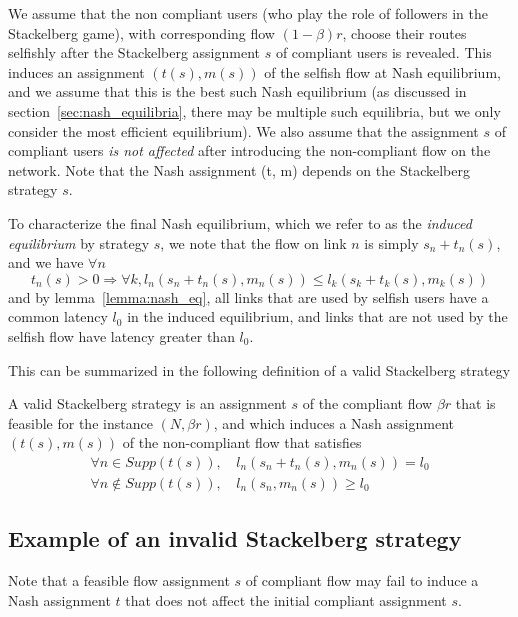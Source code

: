 We assume that the non compliant users (who play the role of followers in the Stackelberg game), with corresponding flow $(1-\beta)r$, choose their routes selfishly after the Stackelberg assignment $s$ of compliant users is revealed. This induces an assignment $(t(s), m(s))$ of the selfish flow at Nash equilibrium, and we assume that this is the best such Nash equilibrium (as discussed in section~\ref{sec:nash_equilibria}, there may be multiple such equilibria, but we only consider the most efficient equilibrium). We also assume that the assignment $s$ of compliant users \emph{is not affected} after introducing the non-compliant flow on the network. Note that the Nash assignment (t, m) depends on the Stackelberg strategy $s$.

To characterize the final Nash equilibrium, which we refer to as the \emph{induced equilibrium} by strategy $s$, we note that the flow on link $n$ is simply $s_n + t_n(s)$, and we have $\forall n$
\[
t_n(s) > 0 \Rightarrow \forall k, l_n \left( s_n + t_n(s), m_n(s) \right) \leq l_k \left( s_k + t_k(s), m_k(s) \right)
\]
and by lemma~\ref{lemma:nash_eq}, all links that are used by selfish users have a common latency $l_0$ in the induced equilibrium, and links that are not used by the selfish flow have latency greater than $l_0$.

This can be summarized in the following definition of a valid Stackelberg strategy


\begin{definition}
A valid Stackelberg strategy is an assignment $s$ of the compliant flow $\beta r$ that is feasible for the instance $(N, \beta r)$, and which induces a Nash assignment $(t(s), m(s))$ of the non-compliant flow that satisfies
\begin{align*}
\forall n \in Supp \left( t(s) \right),\, &l_n \left( s_n + t_n(s), m_n(s) \right) = l_0 \\
\forall n \notin Supp \left( t(s) \right),\, &l_n \left( s_n, m_n(s) \right) \geq l_0
\end{align*}
\end{definition}


\subsection{Example of an invalid Stackelberg strategy} Note that a feasible flow assignment $s$ of compliant flow may fail to induce a Nash assignment $t$ that does not affect the initial compliant assignment $s$.

